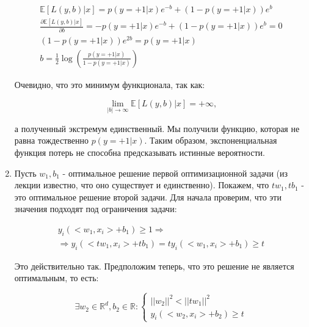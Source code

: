 \documentclass{article}
\begin{document}
\begin{enumerate}
    \small
    \begin{gather*}
        \mathbb{E} \left[ L(y, b) | x \right] = p(y = +1 | x) e^{-b} + (1 - p(y = +1 | x)) e^{b} \\
        \frac{\partial \mathbb{E} \left[ L(y, b) | x \right]}{\partial b} = - p(y = +1 | x) e^{-b} + (1 - p(y = +1 | x)) e^{b} = 0 \\
        (1 - p(y = +1 | x)) e^{2b} = p(y = +1 | x) \\
        b = \frac{1}{2} \log {\left( \frac{p(y = +1 | x)}{1 - p(y = +1 | x)} \right)}
    \end{gather*}
    \normalsize

    Очевидно, что это минимум функционала, так как:

    \small
    \begin{equation*}
        \lim_{|b| \rightarrow \infty} \mathbb{E} \left[ L(y, b) | x \right] = + \infty,
    \end{equation*}
    \normalsize

    а полученный экстремум единственный. Мы получили функцию, которая не равна тождественно $ p(y = +1 | x) $.
    Таким образом, экспоненциальная функция потерь не способна предсказывать истинные вероятности.

    \item Пусть $ w_1, b_1 $ - оптимальное решение первой оптимизационной задачи (из лекции известно, что оно существует и единственно).
    Покажем, что $ t w_1, t b_1 $ - это оптимальное решение второй задачи. Для начала проверим, что эти значения подходят под ограничения задачи:

    \small
    \begin{gather*}
        y_i (<w_1, x_i> + b_1) \ge 1 \Rightarrow \\
        \Rightarrow y_i (<t w_1, x_i> + t b_1) = t y_i (<w_1, x_i> + b_1) \ge t
    \end{gather*}
    \normalsize

    Это действительно так. Предположим теперь, что это решение не является оптимальным, то есть:

    \small
    \begin{equation*}
        \exists w_2 \in \mathbb{R}^d, b_2 \in \mathbb{R}:
        \begin{cases}
            {|| w_2 ||}^2 < {|| t w_1 ||}^2 \\
            y_i (<w_2, x_i> + b_2) \ge t
        \end{cases}
    \end{equation*}
    \normalsize


\end{enumerate}
\end{document}
